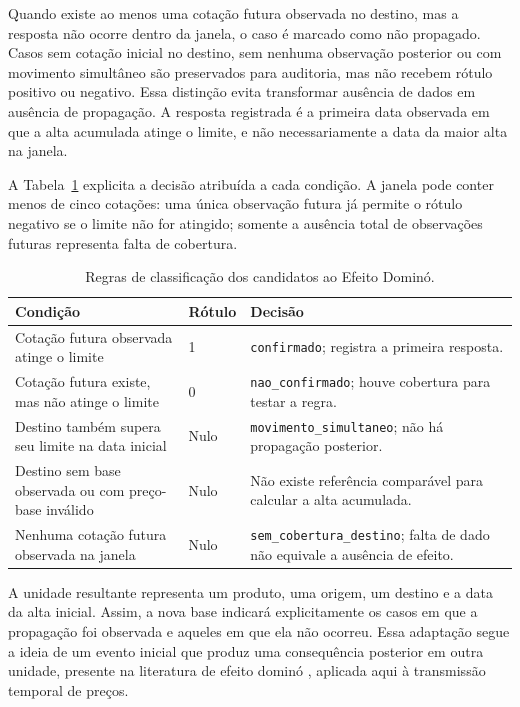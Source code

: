 \documentclass[12pt,a4paper]{article}
\begin{document}
Quando existe ao menos uma cotação futura observada no destino, mas a resposta
não ocorre dentro da janela, o caso é marcado como não propagado. Casos sem
cotação inicial no destino, sem nenhuma observação posterior ou com movimento
simultâneo são preservados para auditoria, mas não recebem rótulo positivo ou
negativo. Essa distinção evita transformar ausência de dados em ausência de
propagação. A resposta registrada é a primeira data observada em que a alta
acumulada atinge o limite, e não necessariamente a data da maior alta na
janela.

A Tabela~\ref{tab:regra-domino} explicita a decisão atribuída a cada condição.
A janela pode conter menos de cinco cotações: uma única observação futura já
permite o rótulo negativo se o limite não for atingido; somente a ausência
total de observações futuras representa falta de cobertura.

\begin{table}[htbp]
    \centering
    \caption{Regras de classificação dos candidatos ao Efeito Dominó.}
    \label{tab:regra-domino}
    \scriptsize
    \begin{tabular}{p{4.0cm}p{2.2cm}p{7.0cm}}
        \toprule
        \textbf{Condição} & \textbf{Rótulo} & \textbf{Decisão} \\
        \midrule
        Cotação futura observada atinge o limite & 1 &
        \texttt{confirmado}; registra a primeira resposta. \\
        Cotação futura existe, mas não atinge o limite & 0 &
        \texttt{nao\_confirmado}; houve cobertura para testar a regra. \\
        Destino também supera seu limite na data inicial & Nulo &
        \texttt{movimento\_simultaneo}; não há propagação posterior. \\
        Destino sem base observada ou com preço-base inválido & Nulo &
        Não existe referência comparável para calcular a alta acumulada. \\
        Nenhuma cotação futura observada na janela & Nulo &
        \texttt{sem\_cobertura\_destino}; falta de dado não equivale a ausência de efeito. \\
        \bottomrule
    \end{tabular}
\end{table}

A unidade resultante representa um produto, uma origem, um destino e a data
da alta inicial. Assim, a nova base indicará explicitamente os casos em que a
propagação foi observada e aqueles em que ela não ocorreu. Essa adaptação segue
a ideia de um evento inicial que produz uma consequência posterior em outra
unidade, presente na literatura de efeito dominó \cite{swuste2019}, aplicada
aqui à transmissão temporal de preços.
\end{document}
